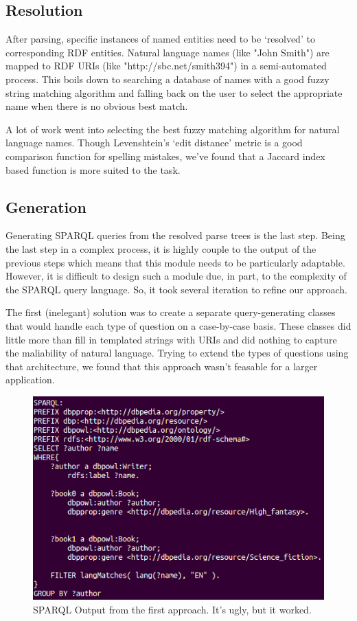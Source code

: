 \documentclass[11pt]{article}
\begin{document}
\subsection{Resolution}
After parsing, specific instances of named entities need to be `resolved' to
corresponding RDF entities. Natural language names (like "John Smith") are mapped
to RDF URIs (like "http://sbc.net/smith394")
in a semi-automated process. This boils down to searching a
database of names with a good fuzzy string matching algorithm and falling
back on the user to select the appropriate name when there is no obvious best 
match.

A lot of work went into selecting the best fuzzy matching algorithm for
natural language names. Though Levenshtein's `edit distance' metric
is a good comparison function for spelling mistakes, we've found that
a Jaccard index based function is more suited to the task. 

\subsection{Generation}
Generating SPARQL queries from the resolved parse trees is the last step.
Being the last step in a complex process, it is highly couple to the output of the
previous steps which means that this module needs to be particularly adaptable.
However, it is difficult to design such a module due, in part, to the complexity of 
the SPARQL query language. So, it took several iteration to refine our approach.

The first (inelegant) solution was to create a separate query-generating
classes that would handle each type of question on a case-by-case basis.
These classes did little more than fill in templated strings with URIs and did
nothing to capture the maliability of natural language.
Trying to extend the types of questions using that architecture, we found that
this approach wasn't feasable for a larger application.

\begin{figure}[h!]
    \centering
    \includegraphics[width=1\textwidth,natwidth=1,natheight=1]{imgs/demo/sparql.png}
    \caption{SPARQL Output from the first approach. It's ugly, but it worked.}
    \label{fig:sparql}
\end{figure}
\end{document}
